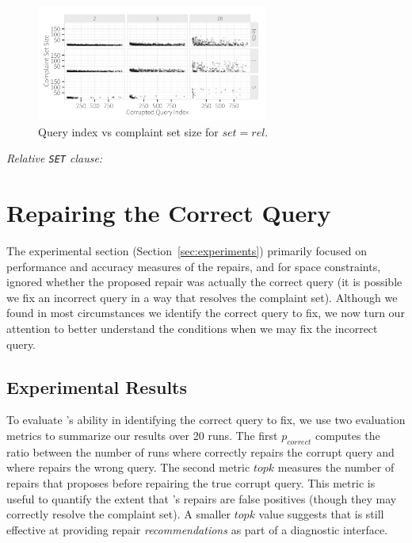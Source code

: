 \begin{figure}[!h]
\centering
\includegraphics[width = 3in]{figures/qidxsimulation/qidx_v_ncomplaints_20attrs_rel}
\caption{Query index vs complaint set size for $set = rel$.}
\label{f:qidx_v_ncomplaints_rel} 
\end{figure}

\smallskip
\emph{Relative \texttt{SET} clause: } 


\section{Repairing the Correct Query}
\label{app:index}

The experimental section (Section~\ref{sec:experiments}) primarily focused on performance and accuracy measures of the repairs, and for space constraints, ignored 
whether the proposed repair was actually the correct query (it is possible we fix an incorrect query in a way that resolves the complaint set).
Although we found in most circumstances we identify the correct query to fix, we now turn our attention to better understand 
the conditions when we may fix the incorrect query. 


\subsection{Experimental Results}
To evaluate \sys's ability in identifying the correct query to fix, we use two evaluation metrics to summarize our results over 20 runs.
The first $p_{correct}$ computes the ratio between the number of runs where \sys correctly repairs the corrupt query and where \sys
repairs the wrong query.  The second metric $topk$ measures the number of repairs that \sys proposes before repairing the true corrupt query.
This metric is useful to quantify the extent that \sys's repairs are false positives (though they may correctly resolve the complaint set).
A smaller $topk$ value suggests that \sys is still effective at providing repair \emph{recommendations} as part of a diagnostic interface.

